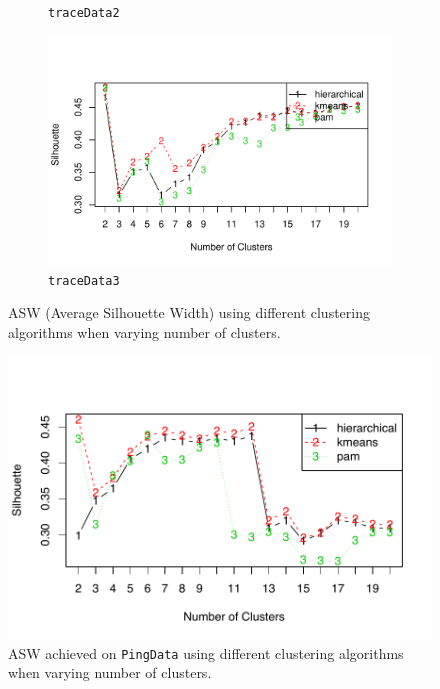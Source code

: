 \begin{figure}[!htb]
\begin{subfigure}[b]{.7\textwidth}
	\caption{\scriptsize \texttt{traceData2}}
	\label{fig:traceSil2}
	\end{subfigure}
	\begin{subfigure}[b]{.7\textwidth}
	\includegraphics[width=\textwidth]{gfx/chap3/traceSil3.pdf}
	\caption{\scriptsize \texttt{traceData3}}
	\label{fig:traceSil3}
	\end{subfigure}
\caption{ASW (Average Silhouette Width) using different clustering algorithms when varying number of clusters.}
\label{fig:sil}
\end{figure}
\fi

\begin{figure}[!htb]
\centering
\includegraphics[width=.7\textwidth]{gfx/chap3/pingSil.pdf}
\caption{\ac{ASW} achieved on \texttt{PingData} using different clustering algorithms when varying number of clusters.}
\label{fig:pingSil}
\end{figure}

